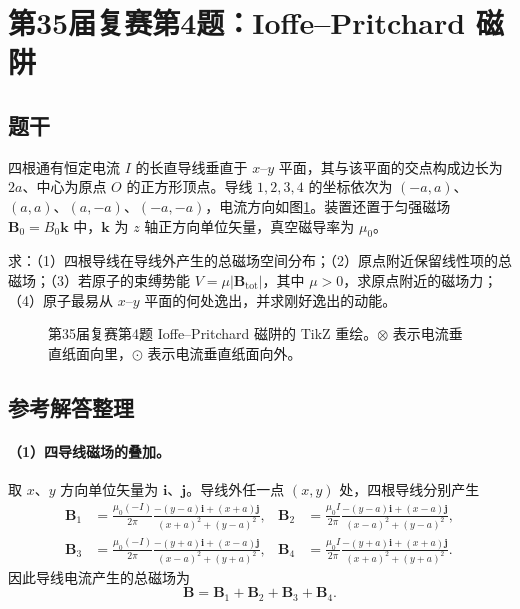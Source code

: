 \section{第35届复赛第4题：Ioffe--Pritchard 磁阱}
\subsection{题干}
四根通有恒定电流 $I$ 的长直导线垂直于 $x$--$y$ 平面，其与该平面的交点构成边长为 $2a$、中心为原点 $O$ 的正方形顶点。导线 $1,2,3,4$ 的坐标依次为 $(-a,a)$、$(a,a)$、$(a,-a)$、$(-a,-a)$，电流方向如图\ref{fig:cpho35q04}。装置还置于匀强磁场 $\boldsymbol B_0=B_0\boldsymbol k$ 中，$\boldsymbol k$ 为 $z$ 轴正方向单位矢量，真空磁导率为 $\mu_0$。

求：（1）四根导线在导线外产生的总磁场空间分布；（2）原点附近保留线性项的总磁场；（3）若原子的束缚势能 $V=\mu\lvert\boldsymbol B_{\mathrm{tot}}\rvert$，其中 $\mu>0$，求原点附近的磁场力；（4）原子最易从 $x$--$y$ 平面的何处逸出，并求刚好逸出的动能。
\begin{figure}[htbp]\centering

\caption{第35届复赛第4题 Ioffe--Pritchard 磁阱的 TikZ 重绘。$\otimes$ 表示电流垂直纸面向里，$\odot$ 表示电流垂直纸面向外。}\label{fig:cpho35q04}
\end{figure}

\subsection{参考解答整理}
\paragraph{（1）四导线磁场的叠加。} 取 $x$、$y$ 方向单位矢量为 $\boldsymbol i$、$\boldsymbol j$。导线外任一点 $(x,y)$ 处，四根导线分别产生
\[
\begin{aligned}
\boldsymbol B_1&=\frac{\mu_0(-I)}{2\pi}\frac{-(y-a)\boldsymbol i+(x+a)\boldsymbol j}{(x+a)^2+(y-a)^2},&
\boldsymbol B_2&=\frac{\mu_0 I}{2\pi}\frac{-(y-a)\boldsymbol i+(x-a)\boldsymbol j}{(x-a)^2+(y-a)^2},\\
\boldsymbol B_3&=\frac{\mu_0(-I)}{2\pi}\frac{-(y+a)\boldsymbol i+(x-a)\boldsymbol j}{(x-a)^2+(y+a)^2},&
\boldsymbol B_4&=\frac{\mu_0 I}{2\pi}\frac{-(y+a)\boldsymbol i+(x+a)\boldsymbol j}{(x+a)^2+(y+a)^2}.
\end{aligned}
\]
因此导线电流产生的总磁场为
\[
\boldsymbol B=\boldsymbol B_1+\boldsymbol B_2+\boldsymbol B_3+\boldsymbol B_4.
\]

